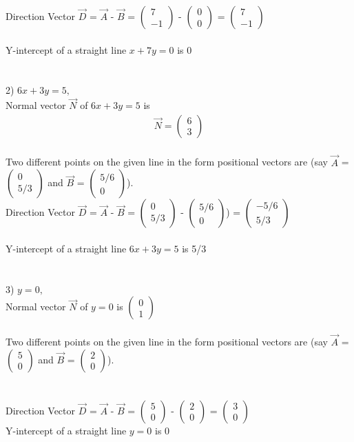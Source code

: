 \documentclass[journal,12pt,twocolumn]{IEEEtran}
\newcommand{\myvec}[1]{\ensuremath{\begin{pmatrix}#1\end{pmatrix}}}
\begin{document}
Direction Vector $\vec{D}$ = $\vec{A}$ - $\vec{B}$ = \myvec{ 7 \\ -1 } - \myvec{ 0 \\ 0 } = \myvec{ 7 \\ -1 }
\\
\\
Y-intercept of a straight line $ x  + 7y =  0 $ is 0
\\
\\
\\
2) $ 6x  + 3y =  5,$
\\
Normal vector $\vec{N}$ of $ 6x  + 3y = 5 $ is   \begin{align}
	\vec{N} = \myvec{ 6 \\ 3 }
\end{align}
\\
	Two different points on the given line in the form positional vectors are (say $\vec{A}$ = \myvec{ 0 \\ 5/3 } and $\vec{B}$ = \myvec{ 5/6 \\ 0 }).\\
Direction Vector $\vec{D}$ = $\vec{A}$ - $\vec{B}$ = \myvec{ 0 \\ 5/3 } - \myvec{ 5/6 \\ 0 }) = \myvec{ -5/6 \\ 5/3 }
\\
\\
Y-intercept of a straight line $ 6x  + 3y =  5 $ is 5/3
\\
\\
\\
3) $ y =  0,$
\\
Normal vector $\vec{N}$ of $ y = 0 $ is   \myvec{ 0 \\ 1 }
\\
\\
	Two different points on the given line in the form positional vectors are (say $\vec{A}$ = \myvec{ 5 \\ 0 } and $\vec{B}$ = \myvec{ 2 \\ 0 }).\\
\\
\\
Direction Vector $\vec{D}$ = $\vec{A}$ - $\vec{B}$ = \myvec{ 5 \\ 0 } - \myvec{ 2 \\ 0 } = \myvec{ 3 \\ 0 }
\\
Y-intercept of a straight line $ y =  0 $ is 0
\end{document}

